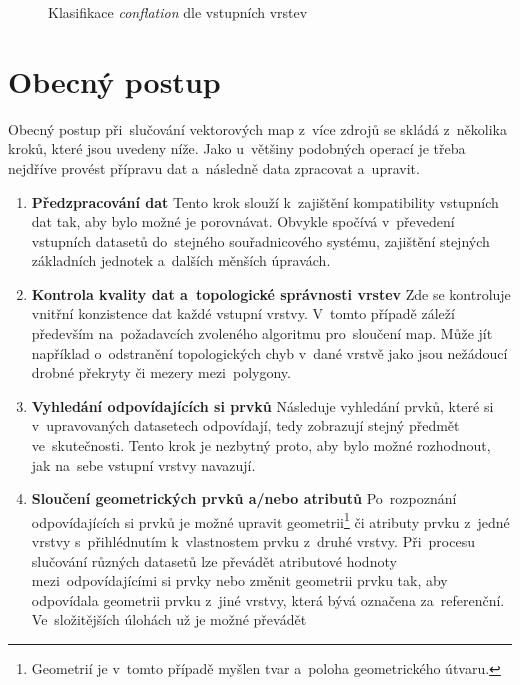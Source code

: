   \begin{figure}[H]
    \centering
      \small
      
      \caption{Klasifikace \textit{conflation} dle vstupních vrstev}
      \label{fig:classification}
  \end{figure}

\section{Obecný postup}
\label{postup}

Obecný postup při~slučování vektorových map z~více zdrojů se skládá z~několika
kroků, které jsou uvedeny níže. Jako u~většiny podobných operací je třeba 
nejdříve provést přípravu dat a~následně data zpracovat a~upravit.

\begin{enumerate}
  \item \textbf{Předzpracování dat}
    \subitem Tento krok slouží k~zajištění kompatibility vstupních dat tak, 
      aby bylo možné je porovnávat. Obvykle spočívá v~převedení vstupních 
      datasetů do~stejného souřadnico\-vé\-ho systému, zajištění stejných 
      základních jednotek a~dalších měnších úpravách. 
  \item \textbf{Kontrola kvality dat a~topologické správnosti vrstev}
    \subitem Zde se kontroluje vnitřní konzistence dat každé vstupní vrstvy.
      V~tomto případě záleží především na~požadavcích zvoleného algoritmu 
      pro~sloučení map. Může jít na\-pří\-klad o~odstranění topologických chyb 
      v~dané vrstvě jako jsou nežádoucí drobné překryty či mezery 
      mezi~polygony.
  \item \textbf{Vyhledání odpovídajících si prvků}
      \subitem Následuje vyhledání prvků, které si v~upravovaných datasetech
      odpovídají, tedy zobrazují stejný předmět ve~skutečnosti. Tento krok je 
      nezbytný proto, aby bylo možné rozhodnout, jak na~sebe vstupní vrstvy 
      navazují.
  \item \textbf{Sloučení geometrických prvků a/nebo atributů}
      \subitem Po~rozpoznání odpovídajících si prvků je možné upravit 
      geometrii\footnote{Geometrií je v~tomto případě myšlen tvar a~poloha 
      geometrického útvaru.} či atributy prvku z~jedné vrstvy s~přihlédnutím 
      k~vlastnostem prvku z~druhé vrstvy. Při~procesu slučování různých datasetů 
      lze převádět atributové hodnoty mezi~odpo\-vídajícími si prvky nebo změnit  
      geometrii prvku tak, aby odpovídala geometrii prvku z~jiné vrstvy, která 
      bývá označena za~referenční. Ve~slo\-ži\-tějších úlohách už je možné převádět 

\end{enumerate}
